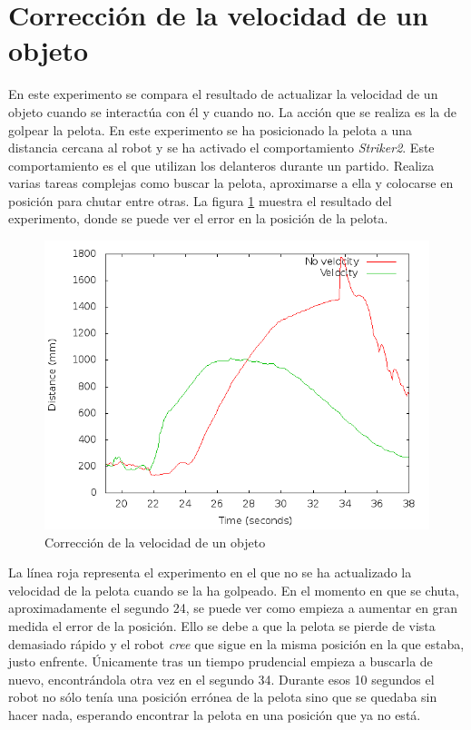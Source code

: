 \section{Corrección de la velocidad de un objeto}
\label{sec:correcionvelocidadobjeto}

En este experimento se compara el resultado de actualizar la velocidad de un objeto cuando se interactúa con él y cuando no. La acción que se realiza es la de golpear la pelota. En este experimento se ha posicionado la pelota a una distancia cercana al robot y se ha activado el comportamiento \textit{Striker2}. Este comportamiento es el que utilizan los delanteros durante un partido. Realiza varias tareas complejas como buscar la pelota, aproximarse a ella y colocarse en posición para chutar entre otras. La figura \ref{fig:exp_kick_no_tracking} muestra el resultado del experimento, donde se puede ver el error en la posición de la pelota. \\

\begin{figure} [h]
  \begin{center}
    \includegraphics[width=15cm]{img/cap5/exp_kick_no_tracking}
  \end{center}
  \caption{Corrección de la velocidad de un objeto}
  \label{fig:exp_kick_no_tracking}
\end{figure}

La línea roja representa el experimento en el que no se ha actualizado la velocidad de la pelota cuando se la ha golpeado. En el momento en que se chuta, aproximadamente el segundo 24, se puede ver como empieza a aumentar en gran medida el error de la posición. Ello se debe a que la pelota se pierde de vista demasiado rápido y el robot \textit{cree} que sigue en la misma posición en la que estaba, justo enfrente. Únicamente tras un tiempo prudencial empieza a buscarla de nuevo, encontrándola  otra vez en el segundo 34. Durante esos 10 segundos el robot no sólo tenía una posición errónea de la pelota sino que se quedaba sin hacer nada, esperando encontrar la pelota en una posición que ya no está. \\

